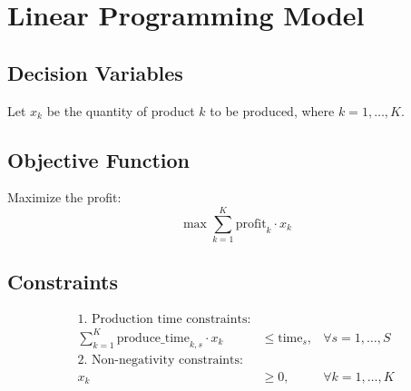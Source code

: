 \documentclass{article}
\begin{document}
\section*{Linear Programming Model}

\subsection*{Decision Variables}
Let \( x_k \) be the quantity of product \( k \) to be produced, where \( k = 1, \ldots, K \).

\subsection*{Objective Function}
Maximize the profit:
\[
\max \sum_{k=1}^{K} \text{profit}_k \cdot x_k
\]

\subsection*{Constraints}
\begin{align*}
\text{1. Production time constraints:} \\
\sum_{k=1}^{K} \text{produce\_time}_{k,s} \cdot x_k & \leq \text{time}_s, & \forall s = 1, \ldots, S \\
\text{2. Non-negativity constraints:} \\
x_k & \geq 0, & \forall k = 1, \ldots, K
\end{align*}
\end{document}
